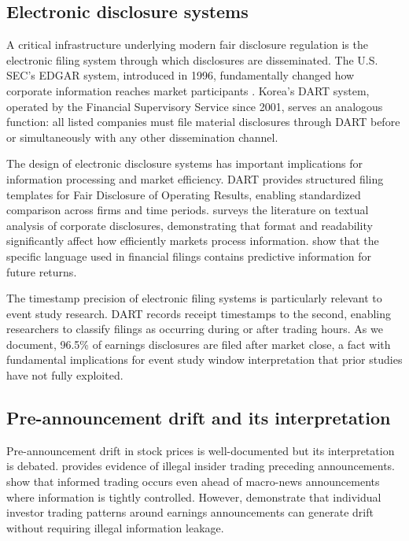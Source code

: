 \documentclass[review,authoryear]{elsarticle}
\begin{document}
\subsection{Electronic disclosure systems}

A critical infrastructure underlying modern fair disclosure regulation is the electronic filing system through which disclosures are disseminated. The U.S. SEC's EDGAR system, introduced in 1996, fundamentally changed how corporate information reaches market participants \citep{bushee2004economic}. Korea's DART system, operated by the Financial Supervisory Service since 2001, serves an analogous function: all listed companies must file material disclosures through DART before or simultaneously with any other dissemination channel.

The design of electronic disclosure systems has important implications for information processing and market efficiency. DART provides structured filing templates for Fair Disclosure of Operating Results, enabling standardized comparison across firms and time periods. \citet{li2010textual} surveys the literature on textual analysis of corporate disclosures, demonstrating that format and readability significantly affect how efficiently markets process information. \citet{loughran2011liability} show that the specific language used in financial filings contains predictive information for future returns.

The timestamp precision of electronic filing systems is particularly relevant to event study research. DART records receipt timestamps to the second, enabling researchers to classify filings as occurring during or after trading hours. As we document, 96.5\% of earnings disclosures are filed after market close, a fact with fundamental implications for event study window interpretation that prior studies have not fully exploited.

\subsection{Pre-announcement drift and its interpretation}

Pre-announcement drift in stock prices is well-documented but its interpretation is debated. \citet{meulbroek1992comparison} provides evidence of illegal insider trading preceding announcements. \citet{bernile2016can} show that informed trading occurs even ahead of macro-news announcements where information is tightly controlled. However, \citet{kaniel2012individual} demonstrate that individual investor trading patterns around earnings announcements can generate drift without requiring illegal information leakage.
\end{document}
